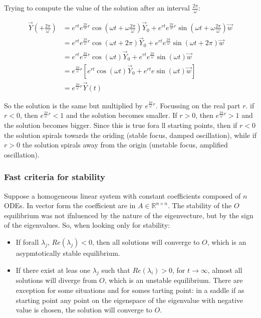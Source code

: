     Trying to compute the value of the solution after an interval $\frac{2\pi}{\omega}$:

    \begin{align*}
      \vec{Y}\left(+ \frac{2\pi}{\omega}\right) &= e^{rt}e^{\frac{2\pi}{\omega}r}\cos\left(\omega t + \omega\frac{2\pi}{\omega}\right)\vec{Y}_0 + e^{rt}e^{\frac{2\pi}{\omega}r}\sin\left(\omega t + \omega\frac{2\pi}{\omega}\right)\vec{w}\\
                                                &= e^{rt}e^{\frac{2\pi}{\omega}r}\cos(\omega t + 2\pi)\vec{Y}_0 + e^{rt}e^{\frac{2\pi}{\omega}}\sin(\omega t + 2\pi)\vec{w}\\
                                                &= e^{rt}e^{\frac{2\pi}{\omega}r}\cos(\omega t)\vec{Y}_0 + e^{rt}e^{\frac{2\pi}{\omega}}\sin(\omega t)\vec{w}\\
                                                &= e^{\frac{2\pi}{\omega}r}\left[e^{rt}\cos(\omega t)\vec{Y}_0 + e^{rt}e\sin(\omega t)\vec{w}\right]\\
                                                &= e^{\frac{2\pi}{\omega}r}\vec{Y}(t)
    \end{align*}

    So the solution is the same but multiplied by $e^{\frac{2\pi}{\omega}r}$.
    Focussing on the real part $r$.
    if $r<0$, then $e^{\frac{2\pi}{\omega}r} < 1$ and the solution becomes smaller.
    If $r>0$, then $e^{\frac{2\pi}{\omega}r} > 1$ and the solution becomes bigger.
    Since this is true fora ll starting points, then if $r<0$ the solution spirals towards the oriding (stable focus, damped oscillation), while if $r>0$ the solution spirals away from the origin (unstable focus, amplified oscillation).

    \subsubsection{Fast criteria for stability}
    Suppose a homogeneous linear system with constant coefficients composed of $n$ ODEs.
    In vector form the coefficient are in $A\in\mathbb{R}^{n\times n}$.
    The stability of the $O$ equilibrium was not ifnluenced by the nature of the eigenvecture, but by the sign of the eigenvalues.
    So, when looking only for stability:

    \begin{multicols}{2}
      \begin{itemize}
        \item If forall $\lambda_j$, $Re(\lambda_j) < 0$, then all solutions will converge to $O$, which is an asypmtotically stable equilibrium.
        \item If there exist at leas one $\lambda_j$ such that $Re(\lambda_i) >0$, for $t\to\infty$, almost all solutions will diverge from $O$, which is an unstable equilibrium.
          There are exception for some situations and for somes tarting point: in a saddle if as starting point any point on the eigenspace of the eigenvalue with negative value is chosen, the solution will converge to $O$.
      \end{itemize}
    \end{multicols}

